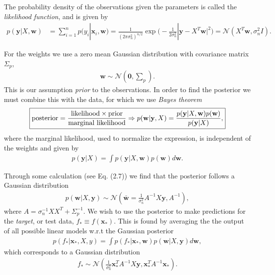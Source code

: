\documentclass[twoside,english]{uiofysmaster}
\begin{document}
The probability density of the observations given the parameters is called the \textit{likelihood function}, and is given by
\begin{align}\label{Eq:: Gaussian linear likelihood function}
p(\textbf{y}|X, \textbf{w}) &= \sum_{i=1}^n p(y_i|\textbf{x}_i, \textbf{w}) = \frac{1}{(2 \pi \sigma_n^2)^{n/2}} \exp \Big( - \frac{1}{2 \sigma_n^2} |\textbf{y}-X^T \textbf{w}|^2 \Big) = \mathcal{N}(X^T \textbf{w}, \sigma_n^2I).
\end{align}

For the weights we use a zero mean Gaussian distribution with covariance matrix $\Sigma_p$,
\begin{align}\label{Eq:: Gaussian linear weight dist}
\textbf{w} \sim \mathcal{N} (\boldsymbol{0}, \sum_p).
\end{align}
This is our assumption \textit{prior} to the observations. In order to find the posterior we must combine this with the data, for which we use \textit{Bayes theorem}
\[
 \boxed{\label{Eq:: Bayes theorem}
\text{posterior} = \frac{\text{likelihood} \times \text{prior}}{\text{marginal likelihood}} \Rightarrow p(\textbf{w}|\textbf{y}, X) = \frac{p(\textbf{y}|X, \textbf{w})p(\textbf{w})}{p(\textbf{y}|X)},}
 \]
where the marginal likelihood, used to normalize the expression, is independent of the weights and given by
\begin{align}\label{Eq:: Marginal likelihood}
p(\textbf{y}|X) = \int p(\textbf{y}|X, \textbf{w}) p(\textbf{w}) d \textbf{w}.
\end{align}

Through some calculation (see \cite{rasmussen2006gaussian} Eq. (2.7)) we find that the posterior follows a Gaussian distribution
\begin{align}
p(\textbf{w}|X, \textbf{y}) \sim \mathcal{N} (\bar{\textbf{w}} = \frac{1}{\sigma_n^2} A^{-1} X \textbf{y}, A^{-1}),
\end{align}
where $A = \sigma_n^{-1}XX^T + \Sigma_p^{-1}$. We wish to use the posterior to make predictions for the \textit{target}, or test data, $f_* \equiv f(\textbf{x}_*)$. This is found by averaging the the output of all possible linear models w.r.t the Gaussian posterior
\begin{align}\label{Eq:: Gaussian linear prediction}
p(f_*|\textbf{x}_*, X, y) = \int p (f_*|\textbf{x}_*, \textbf{w})p(\textbf{w}|X, \textbf{y}) d \textbf{w},
\end{align}
which corresponds to a Gaussian distribution
\begin{align}\label{Eq:: Gaussian linear prediction dist}
f_* \sim \mathcal{N} (\frac{1}{\sigma_n^2} \textbf{x}_*^T A^{-1}X \textbf{y}, \textbf{x}_*^T A^{-1} \textbf{x}_*).
\end{align}
\end{document}
